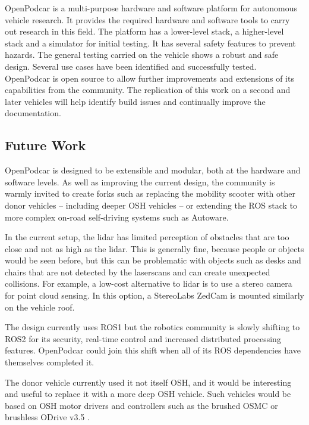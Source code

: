 \documentclass[a4paper]{article}
\begin{document}
	OpenPodcar is a multi-purpose hardware and software platform for autonomous vehicle research. It provides the required hardware and software tools to carry out research in this field. The platform has a lower-level stack, a higher-level stack and a simulator for initial testing. It has several safety features to prevent hazards. The general testing carried on the vehicle shows a robust and safe design. Several use cases have been identified and successfully tested. OpenPodcar is open source to allow further improvements and extensions of its capabilities from the community. The replication of this work on a second and later vehicles will help identify build issues and continually improve the documentation.
	
	\subsection{Future Work}\label{h.neocsr410zj}
	
	OpenPodcar is designed to be extensible and modular, both at the hardware and software levels.  As well as improving the current design, the community is warmly invited to create forks such as replacing the mobility scooter with other donor vehicles -- including deeper OSH vehicles -- or extending the ROS stack to more complex on-road self-driving systems such as Autoware.
	
	In the current setup, the lidar has limited perception of obstacles that are too close and not as high as the lidar. This is generally fine, because people or objects would be seen before, but this can be problematic with objects such as desks and chairs that are not detected by the laserscans and can create unexpected collisions. For example, a low-cost alternative to lidar is to use a stereo camera for point cloud sensing. In this option, a StereoLabs ZedCam is mounted similarly on the vehicle roof. 
	
	The design currently uses ROS1 but the robotics community is slowly shifting to ROS2 for its security, real-time control and increased distributed processing features.  OpenPodcar could join this shift when all of its ROS dependencies have themselves completed it.
	
	The donor vehicle currently used it not itself OSH, and it would be interesting and useful to replace it with a more deep OSH vehicle.   Such vehicles would be based on OSH motor drivers and controllers such as the brushed OSMC \cite{robotpoweropen} or brushless ODrive v3.5  \cite{oriveroboticsodrive}.
	
\end{document}
